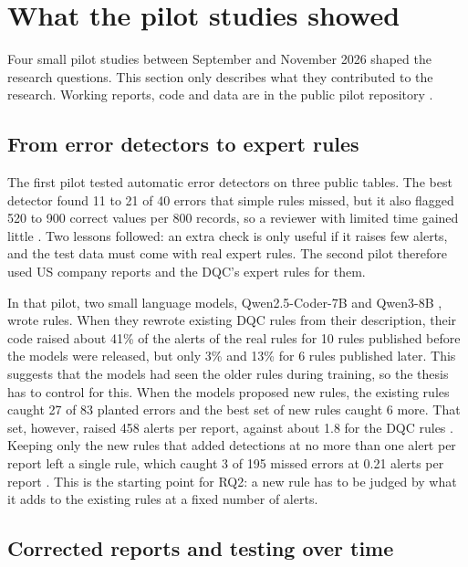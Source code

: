 \documentclass[11pt,a4paper]{article}
\let\oldsection\section
\renewcommand{\section}{\FloatBarrier\oldsection}
\let\oldsubsection\subsection
\renewcommand{\subsection}{\FloatBarrier\oldsubsection}
\begin{document}
\section{What the pilot studies showed}
\label{sec:pilots}

Four small pilot studies between September and November 2026 shaped the research questions. This section only describes what they contributed to the research. Working reports, code and data are in the public pilot repository \cite{repo}.

\subsection{From error detectors to expert rules}
\label{sec:pilot2}

The first pilot tested automatic error detectors on three public tables. The best detector found 11 to 21 of 40 errors that simple rules missed, but it also flagged 520 to 900 correct values per 800 records, so a reviewer with limited time gained little \cite{repo1}. Two lessons followed: an extra check is only useful if it raises few alerts, and the test data must come with real expert rules. The second pilot therefore used US company reports and the DQC's expert rules for them.

In that pilot, two small language models, Qwen2.5-Coder-7B and Qwen3-8B \cite{qwen25coder,qwen3}, wrote rules. When they rewrote existing DQC rules from their description, their code raised about 41\% of the alerts of the real rules for 10 rules published before the models were released, but only 3\% and 13\% for 6 rules published later. This suggests that the models had seen the older rules during training, so the thesis has to control for this. When the models proposed new rules, the existing rules caught 27 of 83 planted errors and the best set of new rules caught 6 more. That set, however, raised 458 alerts per report, against about 1.8 for the DQC rules \cite{pilotreport}. Keeping only the new rules that added detections at no more than one alert per report left a single rule, which caught 3 of 195 missed errors at 0.21 alerts per report \cite{repo}. This is the starting point for RQ2: a new rule has to be judged by what it adds to the existing rules at a fixed number of alerts.

\subsection{Corrected reports and testing over time}
\label{sec:feasibility}
\end{document}
